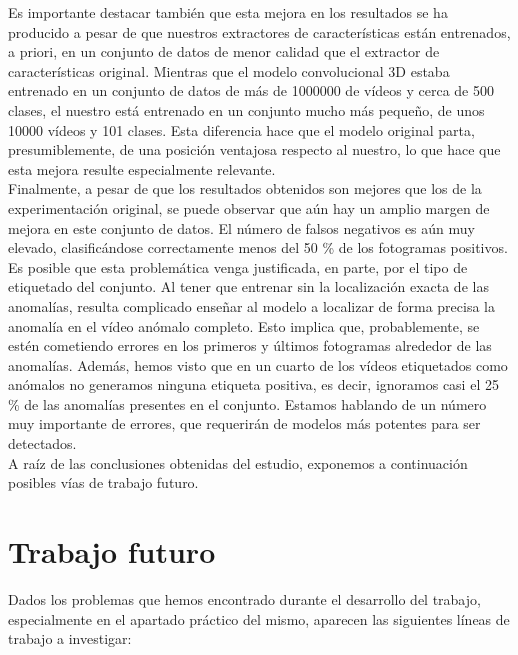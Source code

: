 \documentclass[../main.tex]{memoir}
\begin{document}
Es importante destacar también que esta mejora en los resultados se ha
producido a pesar de que nuestros extractores de características están
entrenados, a priori, en un conjunto de datos de menor calidad que el
extractor de características original. Mientras que el modelo
convolucional 3D estaba entrenado en un conjunto de datos de más de
1000000 de vídeos y cerca de 500 clases, el nuestro está entrenado en
un conjunto mucho más pequeño, de unos 10000 vídeos y 101 clases. Esta
diferencia hace que el modelo original parta, presumiblemente, de una
posición ventajosa respecto al nuestro, lo que hace que esta mejora
resulte especialmente relevante.\\

Finalmente, a pesar de que los resultados obtenidos son mejores que
los de la experimentación original, se puede observar que aún hay un
amplio margen de mejora en este conjunto de datos. El número de falsos
negativos es aún muy elevado, clasificándose correctamente menos del
50 \% de los fotogramas positivos. Es posible que esta problemática
venga justificada, en parte, por el tipo de etiquetado del
conjunto. Al tener que entrenar sin la localización exacta de las
anomalías, resulta complicado enseñar al modelo a localizar de forma
precisa la anomalía en el vídeo anómalo completo. Esto implica que,
probablemente, se estén cometiendo errores en los primeros y últimos
fotogramas alrededor de las anomalías. Además, hemos visto que en un
cuarto de los vídeos etiquetados como anómalos no generamos ninguna
etiqueta positiva, es decir, ignoramos casi el 25 \% de las anomalías
presentes en el conjunto. Estamos hablando de un número muy importante
de errores, que requerirán de modelos más potentes para ser detectados.\\

A raíz de las conclusiones obtenidas del estudio, exponemos a
continuación posibles vías de trabajo futuro.

\section{Trabajo futuro}

Dados los problemas que hemos encontrado durante el desarrollo del
trabajo, especialmente en el apartado práctico del mismo, aparecen las
siguientes líneas de trabajo a investigar:
\end{document}
